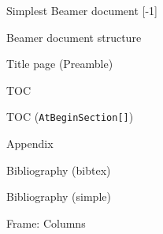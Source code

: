 \graphicspath{{sec02/images/}{sec02/code/}}
\lstset{inputpath=sec02/code/}

\begin{frame}[label=simple,fragile]{Simplest Beamer document}\relax
    \cprotect{}
    \vspace{15mm}
    [-1]
\end{frame}

\begin{frame}[fragile]{Beamer document structure}\relax
    
\end{frame}

\begin{frame}[fragile]{Title page (Preamble)}\relax
    \cprotect{}
\end{frame}

\begin{frame}[fragile]{TOC}\relax
    \cprotect{}
\end{frame}

\begin{frame}[fragile]{TOC ({\tt AtBeginSection[]})}\relax
    \cprotect{}
\end{frame}


\begin{frame}[fragile]{Appendix}\relax
    \cprotect{}
\end{frame}

\begin{frame}[fragile]{Bibliography (bibtex)}\relax
    \cprotect{}
\end{frame}

\begin{frame}[fragile]{Bibliography (simple)}\relax
    \cprotect{}
\end{frame}

\begin{frame}[fragile]{Frame: Columns}\relax
    \cprotect{}
\end{frame}

